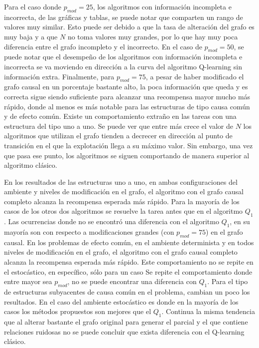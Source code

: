 Para el caso donde $p_{mod} = 25$, los algoritmos con información incompleta e incorrecta,
de las gráficas y tablas, se puede notar que comparten un rango de valores muy similar.
Esto puede ser debido 
a que la tasa de alteración del grafo es muy baja y  a que $N$ no toma
valores muy grandes, por lo que hay muy poca diferencia entre el grafo incompleto y el incorrecto. 
En el caso de $p_{mod} = 50$, se
puede notar que el desempeño de los algoritmos
con información incompleta e incorrecta se 
va moviendo en dirección a la curva del algoritmo
Q-learning sin información extra.
Finalmente, para $p_{mod} = 75$,  a pesar de haber modificado el grafo
causal en un porcentaje bastante alto, la poca información que queda y es correcta sigue siendo suficiente para alcanzar una recompensa mayor mucho más rápido, donde al menos es más notable para las estructuras de tipo causa común y de efecto común.
Existe un comportamiento extraño en las tareas con una estructura del tipo uno a uno. Se puede ver que entre más crece el valor de $N$ los algoritmos que utilizan el grafo tienden a decrecer en dirección al punto de transición en el que la explotación llega a su máximo valor. Sin embargo, una vez que pasa ese punto, los algoritmos se siguen comportando de manera superior al algoritmo clásico.

En los resultados de las estructuras uno a uno, en ambas configuraciones del ambiente y niveles de 
modificación en el grafo, el algoritmo con el grafo 
causal completo alcanza la recompensa esperada más rápido.
Para la mayoría de los casos de los otros dos algoritmos se 
resuelve la tarea antes que en el algoritmo $Q_1$. Las 
ocurrencias donde no se encontró una
diferencia con el algoritmo $Q_1$, en su mayoría son 
con respecto a modificaciones grandes (con $p_{mod}=75$) en el 
grafo causal.
En los problemas de efecto común, en el ambiente determinista y en todos niveles de  modificación en el grafo, el algoritmo con el grafo 
causal completo alcanza la recompensa esperada más rápido.
Este comportamiento no se repite en el estocástico,
en específico, sólo para un caso
Se repite el comportamiento donde
entre mayor sea $p_{mod}$, no se puede
encontrar una diferencia con $Q_1$.
Para el tipo de estructuras subyacentes de causa común en el problema, cambian 
un poco los resultados. En el caso del ambiente estocástico es donde 
en la mayoría de los casos los métodos propuestos
son mejores que el $Q_1$. Continua la misma tendencia
que al alterar bastante el grafo original para generar
el parcial y el que contiene relaciones ruidosas no se puede
concluir que exista diferencia con el Q-learning clásico.


